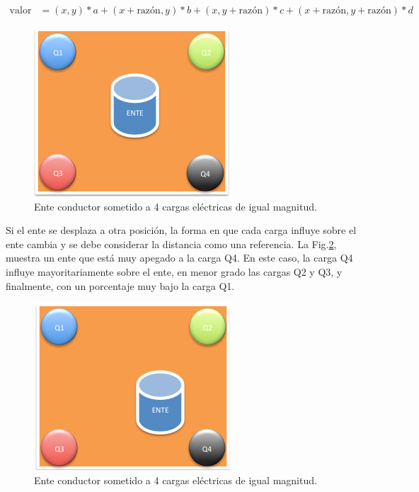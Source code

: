 \begin{align}
  \text{valor} & = (x, y) * a + (x + \text{razón}, y) * b + (x, y +
  \text{razón}) * c + (x + \text{razón}, y + \text{razón}) * d
  \label{eq:interpolar}
\end{align}

\begin{figure}[hb!]
  \begin{center}
    \includegraphics[scale=.5]{image/enteCentrado}
  \end{center}
  \caption{Ente conductor sometido a 4 cargas eléctricas de igual
  magnitud.}\label{img:enteCentrado}
\end{figure}

Si el ente se desplaza a otra posición, la forma en que cada carga
influye sobre el ente cambia y se debe considerar la distancia como
una referencia. La Fig.\ref{img:enteNoCentrado}, muestra un ente que
está muy apegado a la carga Q4. En este caso, la carga Q4 influye
mayoritariamente sobre el ente, en menor grado las cargas Q2 y Q3, y
finalmente, con un porcentaje muy bajo la carga Q1.

\begin{figure}[hb!]
  \begin{center}
    \includegraphics[scale=.5]{image/enteNoCentrado}
  \end{center}
  \caption{Ente conductor sometido a 4 cargas eléctricas de igual
  magnitud.}\label{img:enteNoCentrado}
\end{figure}

